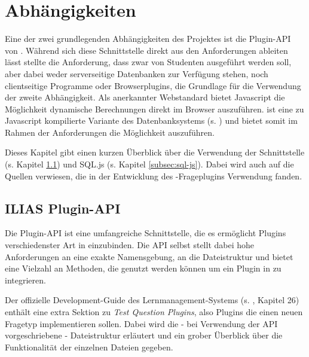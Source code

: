 \section{Abhängigkeiten}
\label{sec:schnittstellen}

Eine der zwei grundlegenden Abhängigkeiten des  Projektes ist die Plugin-API von . Während sich diese Schnittstelle direkt aus den Anforderungen ableiten lässt stellte die Anforderung, dass  zwar von Studenten ausgeführt werden soll, aber dabei weder serverseitige Datenbanken zur Verfügung stehen, noch clientseitige Programme oder Browserplugins, die Grundlage für die Verwendung der zweite Abhängigkeit. Als anerkannter Webstandard bietet Javascript die Möglichkeit dynamische Berechnungen direkt im Browser auszuführen.  ist eine zu Javascript kompilierte Variante des Datenbanksystems  (s. \cite{SQLjs}) und bietet somit im Rahmen der Anforderungen die Möglichkeit  auszuführen.

Dieses Kapitel gibt einen kurzen Überblick über die Verwendung der  Schnittstelle (s. Kapitel \ref{subsec:ilias-plugin-api}) und SQL.js (s. Kapitel \ref{subsec:sql-js}). Dabei wird auch auf die Quellen verwiesen, die in der Entwicklung des -Frageplugins Verwendung fanden. 

\subsection{ILIAS Plugin-API}
\label{subsec:ilias-plugin-api}
    Die  Plugin-API ist eine umfangreiche Schnittstelle, die es ermöglicht Plugins verschiedenster Art in  einzubinden. Die API selbst stellt dabei hohe Anforderungen an eine exakte Namensgebung, an die Dateistruktur und bietet eine Vielzahl an Methoden, die genutzt werden können um ein Plugin in  zu integrieren. 
    
    Der offizielle Development-Guide des Lernmanagement-Systems  (s. \cite{IliasDevelopmentGuide}, Kapitel 26) enthält eine extra Sektion zu \glqq\textit{Test Question Plugins}\grqq , also Plugins die einen neuen Fragetyp implementieren sollen. Dabei wird die - bei Verwendung der API vorgeschriebene - Dateistruktur erläutert und ein grober Überblick über die Funktionalität der einzelnen Dateien gegeben.
    
